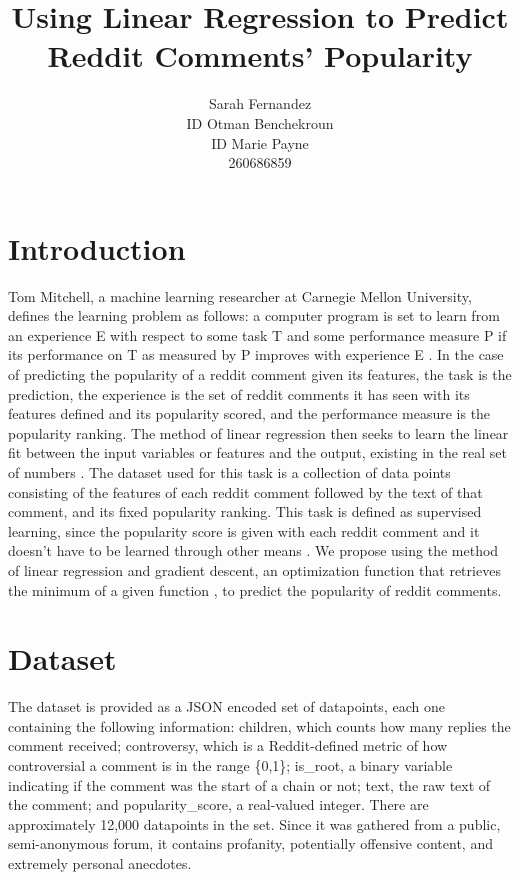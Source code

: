 \documentclass[11pt,letterpaper]{article}
\title{Using Linear Regression to Predict Reddit Comments' Popularity}
\author{Sarah Fernandez\\
	    ID
	  \And
	  Otman Benchekroun\\
	  ID
	  \And
	Marie Payne\\
  	260686859}
\date{}
\begin{document}
\maketitle

\begin{abstract}
 
 
\end{abstract}

\section{Introduction}
 Tom Mitchell, a machine learning researcher at Carnegie Mellon University, defines the learning problem as follows: a computer program is set to learn from an experience E with respect to some task T and some performance measure P if
 its performance on T as measured by P improves with experience E \cite{Mitchell}. In the case of predicting the popularity of a reddit comment given its features, the task is the prediction, the experience is the set of reddit comments it has seen with its features defined and its popularity scored, and the performance measure is the popularity ranking. The method of linear regression then seeks to learn the linear fit between the input variables or features and the output, existing in the real set of numbers \cite{Freedman}. The dataset used for this task is a collection of data points consisting of the features of each reddit comment followed by the text of that comment, and its fixed popularity ranking. This task is defined as supervised learning, since the popularity score is given with each reddit comment and it doesn't have to be learned through other means \cite{Russell}. We propose using the method of linear regression and gradient descent, an optimization function that retrieves the minimum of a given function \cite{Barzilai}, to predict the popularity of reddit comments.

\section{Dataset}
The dataset is provided as a JSON encoded set of datapoints, each one containing the following information: children, which counts how many replies the comment received; controversy, which is a Reddit-defined metric of how controversial a comment is in the range \{0,1\}; is\_root, a binary variable indicating if the comment was the start of a chain or not; text, the raw text of the comment; and popularity\_score, a real-valued integer. There are approximately 12,000 datapoints in the set. Since it was gathered from a public, semi-anonymous forum, it contains profanity, potentially offensive content, and extremely personal anecdotes.
\end{document}
